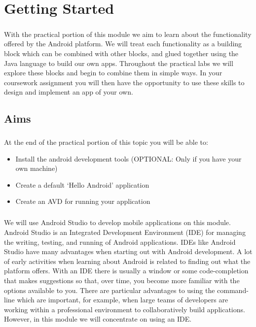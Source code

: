 \documentclass[12pt, a4paper, twoside]{book}
\begin{document}
\chapter{Getting Started}
\label{lab1}
\paragraph{} With the practical portion of this module we aim to learn about the functionality offered by the Android platform. We will treat each functionality as a building block which can be combined with other blocks, and glued together using the Java language to build our own apps. Throughout the practical labs we will explore these blocks and begin to combine them in simple ways. In your coursework assignment you will then have the opportunity to use these skills to design and implement an app of your own.

\section{Aims}
\paragraph{} At the end of the practical portion of this topic you will be able to:

\begin{itemize}
\item Install the android development tools (OPTIONAL: Only if you have your own machine)
\item Create a default `Hello Android' application
\item Create an AVD for running your application
\end{itemize}

\paragraph{} We will use Android Studio to develop mobile applications on this module. Android Studio is an Integrated Development Environment (IDE) for managing the writing, testing, and running of Android applications. IDEs like Android Studio have many advantages when starting out with Android development. A lot of early activities when learning about Android is related to finding out what the platform offers. With an IDE there is usually a window or some code-completion that makes suggestions so that, over time, you become more familiar with the options available to you. There are particular advantages to using the command-line which are important, for example, when large teams of developers are working within a professional environment to collaboratively build applications. However, in this module we will concentrate on using an IDE.
\end{document}
